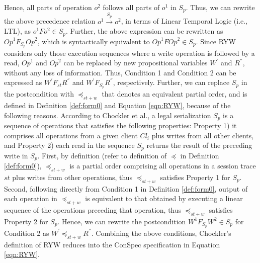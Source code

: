 \documentclass[acmlarge, ,11pt]{acmart}
\begin{document}
    Hence, all parts of operation $\mathit{o}^2$ follows all parts of $\mathit{o}^1$ in $S_p$. Thus, we can rewrite the above precedence relation
  $ \mathit{o}^1 \xrightarrow{S_p} \mathit{o}^2 $, in terms of Linear Temporal Logic (i.e., LTL), as
  $\mathit{o}^1 F \mathit{o}^2 \in S_p$. Further, the above expression
  can be rewritten as $\mathit{Op}^1 F_{S_p} \mathit{Op}^2$, which is syntactically equivalent to $\mathit{Op}^1 F \mathit{Op}^2 \in S_p$. %
  Since RYW considers only those execution sequences where a write operation is followed by a read, $\mathit{Op}^1$ and $\mathit{Op}^2$ can be  replaced  by new propositional variables
   $W^{'}$ and $R^{''}$, without any loss of information. Thus, Condition 1 and Condition 2 can be expressed as  $W^{'} F_\mathit{st} R^{''}$ and $W^{'} F_{S_p}  R^{''} $, respectively. Further, we can replace $S_p$ in the postcondition with  $\preccurlyeq_{\mathit{st}+w}$ that denotes an equivalent partial order, and is defined in Definition \ref{def:form0} and Equation \ref{eqn:RYW}, because of the following reasons.  According to Chockler et al., a legal serialization $S_p$ is a sequence of operations that satisfies the following properties: Property 1) it comprises all operations from a given client $\mathit{Cl}_i$ plus writes from all other clients, and Property 2) each read in the sequence $S_p$ returns the result of the preceding write in $S_p$.  First, by definition (refer to definition of $\preccurlyeq$ in Definition \ref{def:form0}), $\preccurlyeq_{\mathit{st}+w}$ is a partial order  comprising all operations in a session trace $\mathit{st}$ plus writes from other operations, thus $\preccurlyeq_{\mathit{st}+w}$ satisfies Property 1 for $S_p$. Second, following directly from Condition 1 in Definition \ref{def:form0}, output of each operation in $\preccurlyeq_{\mathit{st}+w}$ is equivalent to that obtained by executing a linear sequence of the operations preceding that operation, thus $\preccurlyeq_{\mathit{st}+w}$ satisfies Property 2 for $S_p$. Hence, we can rewrite the postcondition $W^1 F_{S_p} W^2 \in S_p$  for Condition 2 as  $W^{'} \preccurlyeq_{\mathit{st}+w} R^{''}$. Combining the above conditions, Chockler's definition of RYW reduces into the ConSpec specification in Equation \ref{eqn:RYW}.
\end{document}
